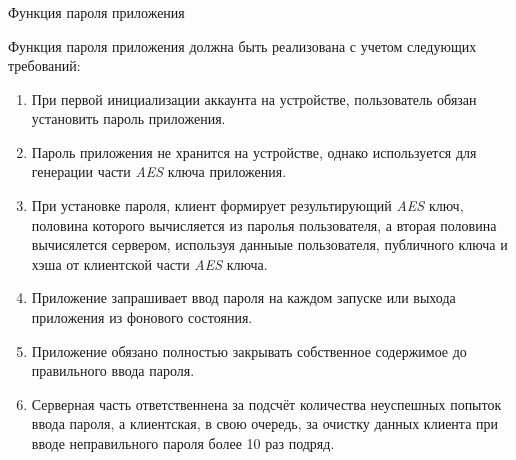 \subsubsection{} Функция пароля приложения
\label{sec:analysis:research:funcreq:pin}

Функция пароля приложения должна быть реализована с учетом следующих требований:
\begin{enumerate}
	\item При первой инициализации аккаунта на устройстве, пользователь обязан установить пароль приложения.
	\item Пароль приложения не хранится на устройстве, однако используется для генерации части \textit{AES} ключа приложения.
	\item При установке пароля, клиент формирует результирующий \textit{AES} ключ, половина которого вычисляется из паролья пользователя, а вторая половина вычисялется сервером, используя данныые пользователя, публичного ключа и хэша от клиентской части \textit{AES} ключа.
	\item Приложение запрашивает ввод пароля на каждом запуске или выхода приложения из фонового состояния.
	\item Приложение обязано полностью закрывать собственное содержимое до правильного ввода пароля.
	\item Серверная часть ответственнена за подсчёт количества неуспешных попыток ввода пароля, а клиентская, в свою очередь, за очистку данных клиента при вводе неправильного пароля более 10 раз подряд.
\end{enumerate}